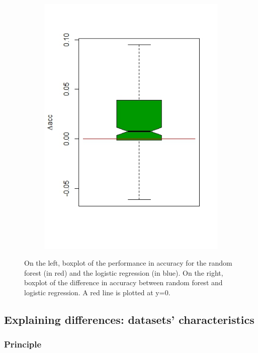 \documentclass[12pt]{article}
\begin{document}
\begin{figure}[h]
\begin{subfigure}{.5\textwidth}
\end{subfigure}%
\begin{subfigure}{.5\textwidth}
  \centering
  \includegraphics[width=.8\linewidth]{Images/Results/DiffAcc.jpeg}
\end{subfigure}
\caption{On the left, boxplot of the performance in accuracy for the random forest (in red) and the logistic regression (in blue). On the right, boxplot of the difference in accuracy between random forest and logistic regression. A red line is plotted at y=0.}
\label{fig:OverallResults}
\end{figure}



\newpage

\subsection{Explaining differences: datasets' characteristics}

\subsubsection{Principle}
\end{document}
